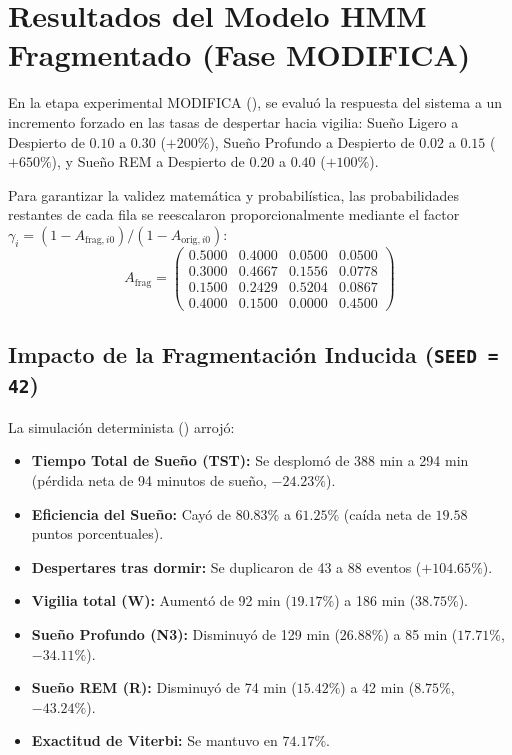 \documentclass[11pt,a4paper]{article}
\begin{document}
\section{Resultados del Modelo HMM Fragmentado (Fase MODIFICA)}

En la etapa experimental MODIFICA (), se evaluó la respuesta del sistema a un incremento forzado en las tasas de despertar hacia vigilia:
Sueño Ligero a Despierto de $0.10$ a $0.30$ ($+200\%$), Sueño Profundo a Despierto de $0.02$ a $0.15$ ($+650\%$), y Sueño REM a Despierto de $0.20$ a $0.40$ ($+100\%$).

Para garantizar la validez matemática y probabilística, las probabilidades restantes de cada fila se reescalaron proporcionalmente mediante el factor $\gamma_i = (1 - A_{\text{frag}, i0}) / (1 - A_{\text{orig}, i0})$:
\begin{equation}
A_{\text{frag}} = \begin{pmatrix}
0.5000 & 0.4000 & 0.0500 & 0.0500 \\
0.3000 & 0.4667 & 0.1556 & 0.0778 \\
0.1500 & 0.2429 & 0.5204 & 0.0867 \\
0.4000 & 0.1500 & 0.0000 & 0.4500
\end{pmatrix}
\end{equation}

\subsection{Impacto de la Fragmentación Inducida (\texttt{SEED = 42})}
La simulación determinista () arrojó:
\begin{itemize}[leftmargin=*,itemsep=1pt]
    \item \textbf{Tiempo Total de Sueño (TST):} Se desplomó de 388 min a 294 min (pérdida neta de 94 minutos de sueño, $-24.23\%$).
    \item \textbf{Eficiencia del Sueño:} Cayó de $80.83\%$ a $61.25\%$ (caída neta de $19.58$ puntos porcentuales).
    \item \textbf{Despertares tras dormir:} Se duplicaron de 43 a 88 eventos ($+104.65\%$).
    \item \textbf{Vigilia total (W):} Aumentó de 92 min ($19.17\%$) a 186 min ($38.75\%$).
    \item \textbf{Sueño Profundo (N3):} Disminuyó de 129 min ($26.88\%$) a 85 min ($17.71\%$, $-34.11\%$).
    \item \textbf{Sueño REM (R):} Disminuyó de 74 min ($15.42\%$) a 42 min ($8.75\%$, $-43.24\%$).
    \item \textbf{Exactitud de Viterbi:} Se mantuvo en $74.17\%$.
\end{itemize}
\end{document}
